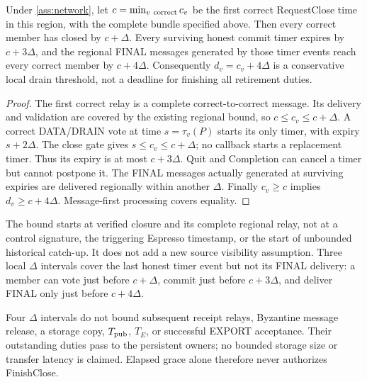 \begin{proposition}
\label{prop:retirement-drain}
Under \cref{ass:network}, let $c=\min_{v\ {\rm correct}}c_v$ be the first
correct RequestClose time in this region, with the complete bundle
specified above. Then every correct member has closed by $c+\Delta$.
Every surviving honest commit timer expires by $c+3\Delta$, and the
regional FINAL messages generated by those timer events reach every
correct member by $c+4\Delta$. Consequently $d_v=c_v+4\Delta$ is a
conservative local drain threshold, not a deadline for finishing all
retirement duties.
\end{proposition}
\begin{proof}
The first correct relay is a complete correct-to-correct message.
Its delivery and validation are covered by the existing regional bound,
so $c\le c_v\le c+\Delta$. A correct DATA/DRAIN vote at time
$s=\tau_v(P)$ starts its only timer, with expiry $s+2\Delta$.
The close gate gives $s\le c_v\le c+\Delta$; no callback starts a
replacement timer. Thus its expiry is at most $c+3\Delta$.
Quit and Completion can cancel a timer but cannot postpone it.
The FINAL messages actually generated at surviving expiries are
delivered regionally within another $\Delta$. Finally $c_v\ge c$
implies $d_v\ge c+4\Delta$. Message-first processing covers equality.
\end{proof}

The bound starts at verified closure and its complete regional relay,
not at a control signature, the triggering Espresso timestamp, or the
start of unbounded historical catch-up. It does not add a new source
visibility assumption. Three local $\Delta$ intervals cover the last
honest timer event but not its FINAL delivery: a member can vote just
before $c+\Delta$, commit just before $c+3\Delta$, and deliver FINAL
only just before $c+4\Delta$.

Four $\Delta$ intervals do not bound subsequent receipt relays,
Byzantine message release, a storage copy, $T_{\rm pub}$, $T_E$, or
successful EXPORT acceptance. Their outstanding duties pass to the
persistent owners; no bounded storage size or transfer latency is
claimed. Elapsed grace alone therefore never authorizes FinishClose.

